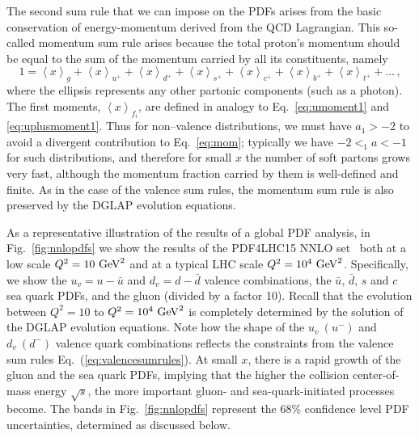 The second sum rule that we can impose on the PDFs arises
from the basic conservation of energy-momentum derived from
the QCD Lagrangian.
%
This so-called momentum sum rule arises
because the total
proton's momentum should be equal to the sum of the momentum
carried by all its constituents, namely
\begin{equation}\label{eq:mom}
1 = \left\langle x\right\rangle _{g}+\left\langle x\right\rangle _{u^{+}}+\left\langle x\right\rangle _{d^{+}}+\left\langle x\right\rangle _{s^{+}}+\left\langle x\right\rangle _{c^{+}}+\left\langle x\right\rangle _{b^{+}}+\left\langle x\right\rangle _{t^{+}}+\ldots\,,
\end{equation}
%
where the ellipsis represents any other partonic components (such
as a photon). The first moments, $\left\langle x\right\rangle _{f_i}$, are defined in analogy to Eq.~\eqref{eq:umoment1} and \eqref{eq:uplusmoment1}. Thus for non--valence distributions, we must have $a_1>-2$ to avoid a divergent contribution to
Eq.~\eqref{eq:mom}; typically we have $-2<_1a<-1$ for such distributions, and therefore for small $x$ the number of soft partons
grows very fast, although the momentum fraction carried by them is well-defined
and finite.
%
As in the case of the valence sum rules, the momentum
sum rule is also preserved by the DGLAP evolution equations.

As a representative illustration of the results of a global
PDF analysis, in Fig.~\ref{fig:nnlopdfs} we show
the results of the PDF4LHC15 NNLO set~\cite{Butterworth:2015oua}
both at a low scale
    $Q^2=10~{\rm GeV}^2$  and at a typical LHC scale
    $Q^2=10^4~{\rm GeV}^2$.
    Specifically, we show the  $u_v=u-\bar{u}$ and $d_v=d-\bar{d}$ valence combinations, the $\bar{u}$,
    $\bar{d}$, $s$ and $c$ sea quark PDFs, and the gluon (divided by a factor 10).
    Recall that the evolution between $Q^2=10$ to $Q^2=10^4~{\rm GeV}^2$ is completely
    determined by the solution of
     the DGLAP evolution equations.
    Note how the shape of the $u_v~(u^{-})$ and $d_v~(d^{-})$ valence quark combinations
    reflects the constraints from the valence sum rules Eq.~(\ref{eq:valencesumrules}).
    At small $x$, there is a rapid growth of the gluon and the sea quark PDFs, implying
    that the higher the collision center-of-mass energy $\sqrt{s}$, the more
    important gluon- and sea-quark-initiated processes become.
    The bands in Fig.~\ref{fig:nnlopdfs} represent the 68\% confidence level
    PDF uncertainties, determined as discussed below.

